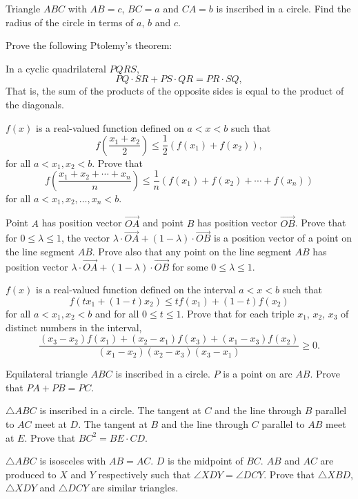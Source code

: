 \begin{problems}
    \problem Triangle $ABC$ with $AB = c$, $BC = a$ and $CA = b$ is inscribed
    in a circle. Find the radius of the circle in terms of $a$, $b$ and $c$. 
    
    \problem Prove the following Ptolemy's theorem: \par In a cyclic
    quadrilateral $PQRS$, $$PQ \cdot SR + PS \cdot QR = PR \cdot SQ,$$ That is,
    the sum of the products of the opposite sides is equal to the product of
    the diagonals. 
    
    \problem $f(x)$ is a real-valued function defined on $a < x < b$ such that 
    \[f \left( \frac{x_{1} + x_{2}}{2} \right) \leq \frac{1}{2}(f(x_{1}) +
    f(x_{2})),\] 
    for all $a < x_{1}, x_{2} < b$. Prove that 
    \[f\left(\frac{x_{1} + x_{2} + \cdots + x_{n}}{n}\right)\leq
    \frac{1}{n}(f(x_{1}) + f(x_{2}) + \cdots + f(x_{n}))\] 
    for all $a < x_{1}, x_{2}, \ldots, x_{n} < b$. 
    
    \problem Point $A$ has position vector $\overrightarrow{OA}$ and point $B$
    has position vector $\overrightarrow{OB}$. Prove that for $0\leq \lambda
    \leq 1$, the vector $\lambda \cdot \overrightarrow{OA} + (1 - \lambda)
    \cdot \overrightarrow{OB}$ is a position vector of a point on the line
    segment $AB$. Prove also that any point on the line segment $AB$ has
    position vector $\lambda \cdot \overrightarrow{OA} + (1 - \lambda) \cdot
    \overrightarrow{OB}$ for some $0\leq \lambda \leq 1$. 
    
    \problem $f(x)$ is a real-valued function defined on the interval $a < x <
    b$ such that 
    \[f(tx_{1} + (1 - t)x_{2}) \leq tf(x_{1}) + (1 - t)f(x_{2})\] 
    for all $a < x_{1}, x_{2} < b$ and for all $0 \leq t \leq 1$. Prove that
    for each triple $x_1$, $x_2$, $x_3$ of distinct numbers in the interval, 
    \[\frac{(x_{3} - x_{2})f(x_{1}) + (x_{2} - x_{1})f(x_{3}) + (x_{1} -
    x_{3})f(x_{2})}{(x_{1} - x_{2})(x_{2} - x_{3})(x_{3} - x_{1})}\geq 0.\]
    
    \problem Equilateral triangle $ABC$ is inscribed in a circle. $P$ is a
    point on arc $AB$. Prove that $PA + PB = PC$. 
    
    \problem $\triangle ABC$ is inscribed in a circle. The tangent at $C$ and
    the line through $B$ parallel to $AC$ meet at $D$. The tangent at $B$ and
    the line through $C$ parallel to $AB$ meet at $E$. Prove that $BC^2 = BE
    \cdot CD$. 
    
    \problem $\triangle ABC$ is isosceles with $AB = AC$. $D$ is the midpoint
    of $BC$. $AB$ and $AC$ are produced to $X$ and $Y$ respectively such that
    $\angle XDY = \angle DCY$. Prove that $\triangle XBD$, $\triangle XDY$ and
    $\triangle DCY$ are similar triangles. 
    

\end{problems}
